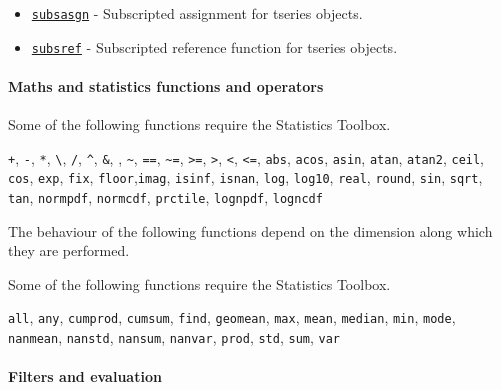 \begin{itemize}
\itemsep1pt\parskip0pt
\item
  \href{tseries/subsasgn}{\texttt{subsasgn}} - Subscripted assignment
  for tseries objects.
\item
  \href{tseries/subsref}{\texttt{subsref}} - Subscripted reference
  function for tseries objects.
\end{itemize}

\paragraph{Maths and statistics functions and
operators}\label{maths-and-statistics-functions-and-operators}

Some of the following functions require the Statistics Toolbox.

\texttt{+}, \texttt{-}, \texttt{*}, \texttt{\textbackslash{}},
\texttt{/}, \texttt{\^{}}, \texttt{\&}, \texttt{\textbar{}},
\texttt{\textasciitilde{}}, \texttt{==}, \texttt{\textasciitilde{}=},
\texttt{\textgreater{}=}, \texttt{\textgreater{}}, \texttt{\textless{}},
\texttt{\textless{}=}, \texttt{abs}, \texttt{acos}, \texttt{asin},
\texttt{atan}, \texttt{atan2}, \texttt{ceil}, \texttt{cos},
\texttt{exp}, \texttt{fix}, \texttt{floor},\texttt{imag},
\texttt{isinf}, \texttt{isnan}, \texttt{log}, \texttt{log10},
\texttt{real}, \texttt{round}, \texttt{sin}, \texttt{sqrt},
\texttt{tan}, \texttt{normpdf}, \texttt{normcdf}, \texttt{prctile},
\texttt{lognpdf}, \texttt{logncdf}

The behaviour of the following functions depend on the dimension along
which they are performed.

Some of the following functions require the Statistics Toolbox.

\texttt{all}, \texttt{any}, \texttt{cumprod}, \texttt{cumsum},
\texttt{find}, \texttt{geomean}, \texttt{max}, \texttt{mean},
\texttt{median}, \texttt{min}, \texttt{mode}, \texttt{nanmean},
\texttt{nanstd}, \texttt{nansum}, \texttt{nanvar}, \texttt{prod},
\texttt{std}, \texttt{sum}, \texttt{var}

\paragraph{Filters and evaluation}\label{filters-and-evaluation}

